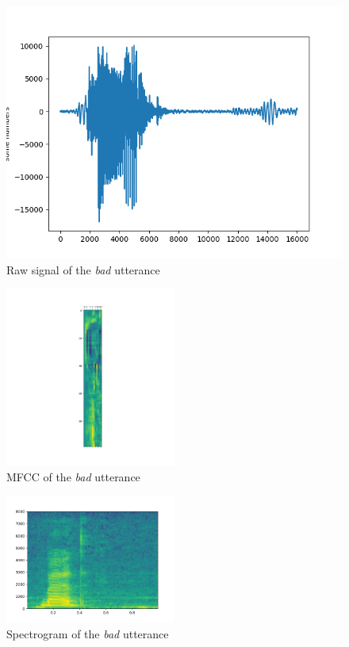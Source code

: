 \begin{figure}
	\centering
	\includegraphics[width=.5\textwidth]{img/bed_rawsignal_plot.png}
	\caption{Raw signal of the \textit{bad} utterance}
	\label{fig:bed_rawsignal}
\end{figure}


\begin{figure}
	\centering
	\includegraphics[width=0.5\textwidth]{img/bed_mfcc_plot.png}
	\caption{MFCC of the \textit{bad} utterance}
	\label{fig:bed_mfcc}
\end{figure}


\begin{figure}
	\centering
	\includegraphics[width=0.5\textwidth]{img/bed_specgram_matplotlib.png}
	\caption{Spectrogram of the \textit{bad} utterance}
	\label{fig:bed_specgram}
\end{figure}


